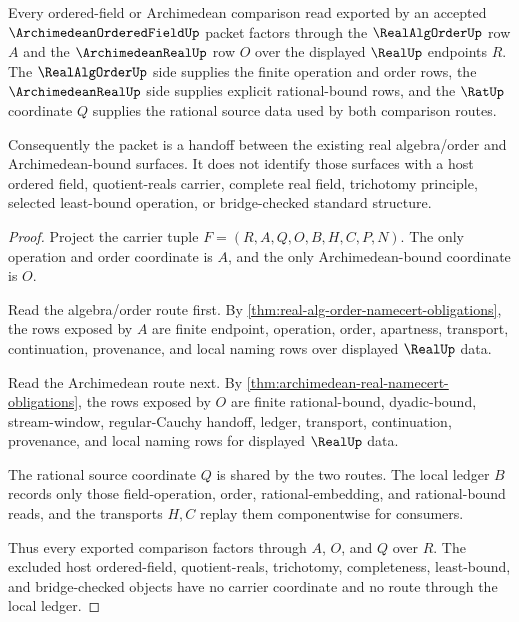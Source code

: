 \begin{theorem}
\label{thm:archimedean-ordered-field-realalgorder-handoff}
Every ordered-field or Archimedean comparison read exported by an accepted $\ArchimedeanOrderedFieldUp$ packet factors through the $\RealAlgOrderUp$ row $A$ and the $\ArchimedeanRealUp$ row $O$ over the displayed $\RealUp$ endpoints $R$. The $\RealAlgOrderUp$ side supplies the finite operation and order rows, the $\ArchimedeanRealUp$ side supplies explicit rational-bound rows, and the $\RatUp$ coordinate $Q$ supplies the rational source data used by both comparison routes.

Consequently the packet is a handoff between the existing real algebra/order and Archimedean-bound surfaces. It does not identify those surfaces with a host ordered field, quotient-reals carrier, complete real field, trichotomy principle, selected least-bound operation, or bridge-checked standard structure.
\end{theorem}
\begin{proof}
Project the carrier tuple $F=(R,A,Q,O,B,H,C,P,N)$. The only operation and order coordinate is $A$, and the only Archimedean-bound coordinate is $O$.

Read the algebra/order route first. By \autoref{thm:real-alg-order-namecert-obligations}, the rows exposed by $A$ are finite endpoint, operation, order, apartness, transport, continuation, provenance, and local naming rows over displayed $\RealUp$ data.

Read the Archimedean route next. By \autoref{thm:archimedean-real-namecert-obligations}, the rows exposed by $O$ are finite rational-bound, dyadic-bound, stream-window, regular-Cauchy handoff, ledger, transport, continuation, provenance, and local naming rows for displayed $\RealUp$ data.

The rational source coordinate $Q$ is shared by the two routes. The local ledger $B$ records only those field-operation, order, rational-embedding, and rational-bound reads, and the transports $H,C$ replay them componentwise for consumers.

Thus every exported comparison factors through $A$, $O$, and $Q$ over $R$. The excluded host ordered-field, quotient-reals, trichotomy, completeness, least-bound, and bridge-checked objects have no carrier coordinate and no route through the local ledger.
\end{proof}

